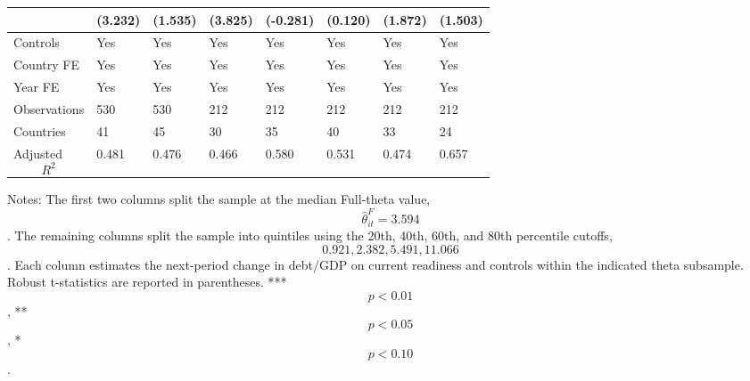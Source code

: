 \begin{table}[H]
\begin{threeparttable}
\begin{tabularx}{\textwidth}{lYYYYYYY}
  & (3.232) & (1.535) & (3.825) & (-0.281) & (0.120) & (1.872) & (1.503) \\
\midrule
Controls & Yes & Yes & Yes & Yes & Yes & Yes & Yes \\
Country FE & Yes & Yes & Yes & Yes & Yes & Yes & Yes \\
Year FE & Yes & Yes & Yes & Yes & Yes & Yes & Yes \\
Observations & 530 & 530 & 212 & 212 & 212 & 212 & 212 \\
Countries & 41 & 45 & 30 & 35 & 40 & 33 & 24 \\
Adjusted $$R^2$$ & 0.481 & 0.476 & 0.466 & 0.580 & 0.531 & 0.474 & 0.657 \\
\bottomrule
\end{tabularx}
\begin{tablenotes}[flushleft]\footnotesize
\item Notes: The first two columns split the sample at the median Full-theta value, $$\widehat{\theta}^{F}_{it}=3.594$$. The remaining columns split the sample into quintiles using the 20th, 40th, 60th, and 80th percentile cutoffs, $$0.921, 2.382, 5.491, 11.066$$. Each column estimates the next-period change in debt/GDP on current readiness and controls within the indicated theta subsample. Robust t-statistics are reported in parentheses. *** $$p<0.01$$, ** $$p<0.05$$, * $$p<0.10$$.
\end{tablenotes}
\end{threeparttable}
\end{table}
